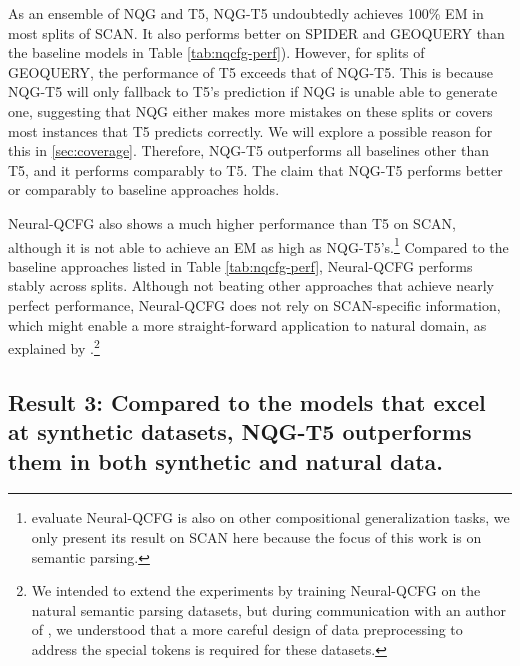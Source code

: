 As an ensemble of NQG and T5, NQG-T5 undoubtedly achieves 100\% EM in most splits of SCAN. 
It also performs better on SPIDER and GEOQUERY than the baseline models in Table \ref{tab:nqcfg-perf}).
However, for splits of GEOQUERY, the performance of T5 exceeds that of NQG-T5.
This is because NQG-T5 will only fallback to T5's prediction if NQG is unable able to generate one, suggesting that NQG either makes more mistakes on these splits or covers most instances that T5 predicts correctly. We will explore a possible reason for this in \cref{sec:coverage}.
Therefore, NQG-T5 outperforms all baselines other than T5, and it performs comparably to T5.
The claim that NQG-T5 performs better or comparably to baseline approaches holds.

Neural-QCFG also shows a much higher performance than T5 on SCAN, although it is not able to achieve an EM as high as NQG-T5's.\footnote{
\cite{kim2021sequencetosequence} evaluate Neural-QCFG is also on other compositional generalization tasks, we only present its result on SCAN here because the focus of this work is on semantic parsing.}
Compared to the baseline approaches listed in Table \ref{tab:nqcfg-perf}, Neural-QCFG performs stably across splits. Although not beating other approaches that achieve nearly perfect performance, Neural-QCFG does not rely on SCAN-specific information, which might enable a more straight-forward application to natural domain, as explained by \citet{kim2021sequencetosequence}.\footnote{We intended to extend the experiments by training Neural-QCFG on the natural semantic parsing datasets, but during communication with an author of \cite{kim2021sequencetosequence}, we understood that a more careful design of data preprocessing to address the special tokens is required for these datasets.}


\subsection{Result 3: Compared to the models that excel at synthetic datasets, NQG-T5 outperforms them in both synthetic and natural data.}
\label{sec:res:syn-nat}

